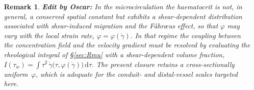 \documentclass[lineno]{jfm}
\newtheorem{remark}{Remark}
\newcommand{\orn}[1]{{\color{red} \textbf{Edit by Oscar:} #1}}
\begin{document}
\begin{remark}
\orn{In the microcirculation the haematocrit is not, in general, a conserved spatial
constant but exhibits a shear-dependent distribution associated with
shear-induced migration and the F\aa hr\ae us effect, so that $\varphi$ may vary
with the local strain rate, $\varphi=\varphi(\dot\gamma)$. In that regime the
coupling between the concentration field and the velocity gradient must be
resolved by evaluating the rheological integral of \S\ref{sec:Rmu} with a
shear-dependent volume fraction,
$I(\tau_w)=\int \tau^2\,\dot\gamma\bigl(\tau,\varphi(\dot\gamma)\bigr)\,
\mathrm{d}\tau$. The present closure retains a cross-sectionally
uniform~$\varphi$, which is adequate for the conduit- and distal-vessel scales
targeted here.}
\end{remark}

\end{document}
